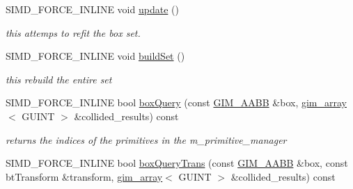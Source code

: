 \begin{Indent}{\bf }\par
\begin{CompactItemize}
\item 
SIMD\_\-FORCE\_\-INLINE void \hyperlink{class_g_i_m___b_o_x___t_r_e_e___t_e_m_p_l_a_t_e___s_e_t_0f5f2b683e561a4e05d912cb4973dac4}{update} ()
\begin{CompactList}\small\item\em this attemps to refit the box set. \item\end{CompactList}\item 
\hypertarget{class_g_i_m___b_o_x___t_r_e_e___t_e_m_p_l_a_t_e___s_e_t_ada2fc55c2e11a4aa5c3ae0c852f4950}{
SIMD\_\-FORCE\_\-INLINE void \hyperlink{class_g_i_m___b_o_x___t_r_e_e___t_e_m_p_l_a_t_e___s_e_t_ada2fc55c2e11a4aa5c3ae0c852f4950}{buildSet} ()}
\label{class_g_i_m___b_o_x___t_r_e_e___t_e_m_p_l_a_t_e___s_e_t_ada2fc55c2e11a4aa5c3ae0c852f4950}

\begin{CompactList}\small\item\em this rebuild the entire set \item\end{CompactList}\item 
\hypertarget{class_g_i_m___b_o_x___t_r_e_e___t_e_m_p_l_a_t_e___s_e_t_5863549e9a3390f9ef1c0883734481ee}{
SIMD\_\-FORCE\_\-INLINE bool \hyperlink{class_g_i_m___b_o_x___t_r_e_e___t_e_m_p_l_a_t_e___s_e_t_5863549e9a3390f9ef1c0883734481ee}{boxQuery} (const \hyperlink{class_g_i_m___a_a_b_b}{GIM\_\-AABB} \&box, \hyperlink{classgim__array}{gim\_\-array}$<$ GUINT $>$ \&collided\_\-results) const }
\label{class_g_i_m___b_o_x___t_r_e_e___t_e_m_p_l_a_t_e___s_e_t_5863549e9a3390f9ef1c0883734481ee}

\begin{CompactList}\small\item\em returns the indices of the primitives in the m\_\-primitive\_\-manager \item\end{CompactList}\item 
\hypertarget{class_g_i_m___b_o_x___t_r_e_e___t_e_m_p_l_a_t_e___s_e_t_21ac3e2b0030e1cfc1a6ddb8376eff2d}{
SIMD\_\-FORCE\_\-INLINE bool \hyperlink{class_g_i_m___b_o_x___t_r_e_e___t_e_m_p_l_a_t_e___s_e_t_21ac3e2b0030e1cfc1a6ddb8376eff2d}{boxQueryTrans} (const \hyperlink{class_g_i_m___a_a_b_b}{GIM\_\-AABB} \&box, const btTransform \&transform, \hyperlink{classgim__array}{gim\_\-array}$<$ GUINT $>$ \&collided\_\-results) const }
\label{class_g_i_m___b_o_x___t_r_e_e___t_e_m_p_l_a_t_e___s_e_t_21ac3e2b0030e1cfc1a6ddb8376eff2d}


\end{CompactItemize}
\end{Indent}
